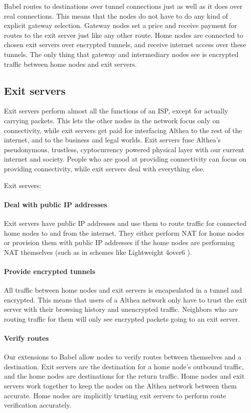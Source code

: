 \documentclass[11pt]{article}
\begin{document}
Babel routes to destinations over tunnel connections just as well as it does over real connections. This means that the nodes do not have to do any kind of explicit gateway selection. Gateway nodes set a price and receive payment for routes to the exit server just like any other route. Home nodes are connected to chosen exit servers over encrypted tunnels, and receive internet access over these tunnels. The only thing that gateway and intermediary nodes see is encrypted traffic between home nodes and exit servers.

\subsection{Exit servers}
Exit servers perform almost all the functions of an ISP, except for actually carrying packets. This lets the other nodes in the network focus only on connectivity, while exit servers get paid for interfacing Althea to the rest of the internet, and to the business and legal worlds. Exit servers fuse Althea’s pseudonymous, trustless, cyptocurrency powered physical layer with our current internet and society. People who are good at providing connectivity can focus on providing connectivity, while exit servers deal with everything else. 

Exit servers:

\paragraph{Deal with public IP addresses}
Exit servers have public IP addresses and use them to route traffic for connected home nodes to and from the internet. They either perform NAT for home nodes or provision them with public IP addresses if the home nodes are performing NAT themselves (such as in schemes like Lightweight 4over6 \cite{4over6}). 

\paragraph{Provide encrypted tunnels}
All traffic between home nodes and exit servers is encapsulated in a tunnel and encrypted. This means that users of a Althea network only have to trust the exit server with their browsing history and unencrypted traffic. Neighbors who are routing traffic for them will only see encrypted packets going to an exit server.

\paragraph{Verify routes}
Our extensions to Babel allow nodes to verify routes between themselves and a destination. Exit servers are the destination for a home node’s outbound traffic, and the home nodes are destinations for the return traffic. Home nodes and exit servers work together to keep the nodes on the Althea network between them accurate. Home nodes are implicitly trusting exit servers to perform route verification accurately.
\end{document}
